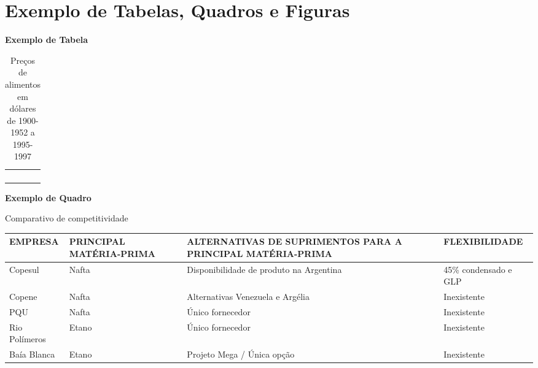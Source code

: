 \section{Exemplo de Tabelas, Quadros e Figuras}

{\centering\bfseries\color{red}
Exemplo de Tabela
\par}

\begin{table}[ht]
\centering
\caption{Preços de alimentos em dólares de 1900-1952 a
1995-1997}
\begin{supertabular}{m{3.6cm}m{3.7cm}m{3.6cm}m{3.0cm}}
\hline
{} &
 &
 &
\centering{}\\\hline
{} &
 &
 &
\centering{}\\
 &
 &
 &
\centering{}\\
 &
 &
 &
\centering{}\\
 &
 &
 &
\centering{}\\\hline
\end{supertabular}
    \label{tab:alimentos}
\end{table}

\bigskip

{\centering\bfseries\color{red}
Exemplo de Quadro
\par}

\begin{quadro}[htb]
\centering
\caption{Comparativo de competitividade}
\begin{supertabular}{|m{2.5cm}|m{2.5cm}|m{6.0cm}|m{3.2cm}|}
\hline
{ EMPRESA } &
{ PRINCIPAL MATÉRIA-PRIMA } &
{ ALTERNATIVAS DE SUPRIMENTOS PARA A PRINCIPAL MATÉRIA-PRIMA } &
{ FLEXIBILIDADE }\\\hline
{ Copesul } &
{ Nafta } &
{ Disponibilidade de produto na Argentina} &
{ 45\% condensado e GLP }\\\hline
{ Copene } &
{ Nafta } &
{ Alternativas Venezuela e Argélia } &
{ Inexistente }\\\hline
{ PQU } &
{ Nafta } &
{ Único fornecedor } &
{ Inexistente }\\\hline
{ Rio Polímeros } &
{ Etano } &
{ Único fornecedor } &
{ Inexistente }\\\hline
{ Baía Blanca } &
{ Etano } &
{ Projeto Mega / Única opção } &
{ Inexistente }\\\hline
\end{supertabular}
    \label{quad:quadro1}
\end{quadro}


